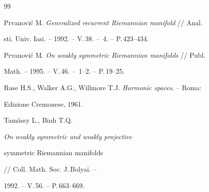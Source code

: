 \begin{thebibliography}{99}


Prvanovi\'c M. {\em Generalized recurrent Riemannian manifold} // Anal.


sti. Univ. Iasi. -- 1992. -- V.\,38. -- \No\,4. -- P.\,423--434.




Prvanovi\'c M. {\em On weakly symmetric Riemannian manifolds} // Publ.


Math. -- 1995. -- V.\,46. -- \No\,1--2. -- P.\,19--25.




Ruse H.S., Walker A.G., Willmore T.J. {\em Harmonic spaces}. -- Roma:


Edizione Cremonese, 1961.




Tam\~assy L., Binh T.Q. {\em On weakly symmetric and weakly projective


symmetric Riemannian manifolds} // Coll. Math. Soc. J.\,Bolyai. --


1992. -- V.\,56. -- P.\,663--669.








\end{thebibliography}





\vskip 2cm












\label{end}





